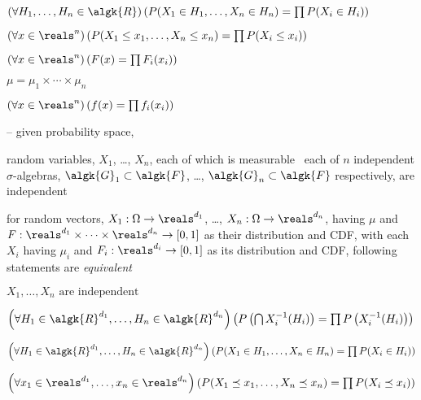 \documentclass[17pt,landscape]{foils}
\newcommand{\algF}{\algk{F}}
\newcommand{\algR}{\algk{R}}
\begin{document}
{	\vitem
		$\left( \forall H_1,\ldots,H_n \in \algR \right) \left( P(X_1\in H_1,\ldots, X_n\in H_n) = \prod P(X_i \in H_i) \right) $

	\vitem
		$\left( \forall x\in \reals^n \right) \left( P(X_1\leq x_1,\ldots, X_n\leq x_n) = \prod P(X_i \leq x_i) \right) $

	\vitem
		$\left( \forall x \in \reals^n \right) \left( F(x) = \prod F_i(x_i) \right) $

	\vitem
		$\mu = \mu_1 \times \cdots \times \mu_n $

	\vitem
		$\left( \forall x \in \reals^n \right) \left( f(x) = \prod f_i(x_i) \right) $
	\eit
\eit



\bit
\item
	[--] given probability space, 


\item
	random variables, $X_1$, \ldots, $X_n$,
	each of which is measurable \wrt\ each of $n$ independent $\sigma$-algebras,
	$\algk{G}_1\subset \algF$, \ldots, $\algk{G}_n\subset \algF$
	respectively,
	are independent%
\eit



\bit
\item for random vectors, $X_1:\Omega\to\reals^{d_1}$, \ldots, $X_n:\Omega\to\reals^{d_n}$,
	having $\mu$ and $F:\reals^{d_1}\times\cdots\times\reals^{d_n}\to[0,1]$ as their distribution and CDF,
	with each $X_i$ having $\mu_i$ and $F_i:\reals^{d_i}\to[0,1]$ as its distribution and CDF,
	following statements are \emph{equivalent}%

	\bit
	\vitem
		$X_1,\ldots,X_n \mbox{ are independent}$

	\vitem
		$
			\left( \forall H_1\in\algR^{d_1}, \ldots, H_n\in \algR^{d_n} \right)
			\left( P\left(\bigcap X_i^{-1}(H_i)\right) = \prod P\left(X_i^{-1}(H_i)\right) \right)
		$

	\vitem
		$
			\left( \forall H_1\in\algR^{d_1}, \ldots, H_n\in \algR^{d_n} \right)
			\left( P(X_1\in H_1,\ldots, X_n\in H_n) = \prod P(X_i \in H_i) \right)
		$

	\vitem
		$
			\left( \forall x_1\in \reals^{d_1},\ldots,x_n\in\reals^{d_n} \right)
			\left( P(X_1\preceq x_1,\ldots, X_n\preceq x_n) = \prod P(X_i \preceq x_i) \right)
		$

}
\end{document}
